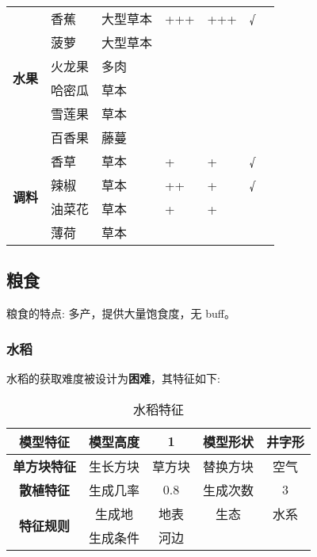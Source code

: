 \begin{table}[H]
\begin{tabular}{l|ll|ll|cl}
        \midrule
        \multirow{6}{*}{\textbf{水果}}& 香蕉 & 大型草本 & +++ & +++ & √ & \\
        & 菠萝 & 大型草本 &  &  &  & \\
        & 火龙果 & 多肉 &  &  &  & \\
        & 哈密瓜 & 草本 &  &  &  & \\
        & 雪莲果 & 草本 &  &  &  & \\
        & 百香果 & 藤蔓 &  &  &  & \\
        \midrule
        \multirow{4}{*}{\textbf{调料}}& 香草 & 草本 & + & + & √ &\\
        & 辣椒 & 草本  & ++ & + & √ &\\
        & 油菜花 & 草本 & + & + &  &\\
        & 薄荷 & 草本 &  &  &  &\\
        \bottomrule
    \end{tabular}
\end{table}

\subsection{粮食}

粮食的特点: 多产，提供大量饱食度，无 buff。

\subsubsection{水稻}

水稻的获取难度被设计为\textbf{困难}，其特征如下:
\begin{table}[H]
    \centering
    \caption{水稻特征}
    \label{table:水稻特征}
    \setlength{\tabcolsep}{4mm}
    \begin{tabular}{c|cc|cc}
        \toprule
        \textbf{模型特征}                  & 模型高度 & 1      & 模型形状 & 井字形 \\
        \midrule
        \textbf{单方块特征}                & 生长方块 & 草方块 & 替换方块 & 空气   \\
        \midrule
        \textbf{散植特征}                  & 生成几率 & 0.8    & 生成次数 & 3      \\
        \midrule
        \multirow{2}{*}{\textbf{特征规则}} & 生成地   & 地表   & 生态     & 水系   \\
                                           & 生成条件 & 河边                       \\
        \bottomrule
    \end{tabular}
\end{table}


